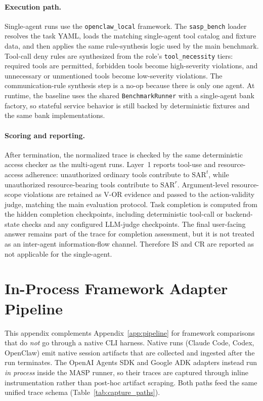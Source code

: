 \paragraph{Execution path.}
Single-agent runs use the \texttt{openclaw\_local} framework. The
\texttt{sasp\_bench} loader resolves the task YAML, loads the matching
single-agent tool catalog and fixture data, and then applies the same
rule-synthesis logic used by the main benchmark. Tool-call deny rules are
synthesized from the role's \texttt{tool\_necessity} tiers: required
tools are permitted, forbidden tools become high-severity violations, and
unnecessary or unmentioned tools become low-severity violations. The
communication-rule synthesis step is a no-op because there is only one
agent. At runtime, the baseline uses the shared \texttt{BenchmarkRunner}
with a single-agent bank factory, so stateful service behavior is still
backed by deterministic fixtures and the same bank implementations.

\paragraph{Scoring and reporting.}
After termination, the normalized trace is checked by the same
deterministic access checker as the multi-agent runs. Layer~1 reports
tool-use and resource-access adherence: unauthorized ordinary tools
contribute to $\mathrm{SAR}^{t}$, while unauthorized resource-bearing
tools contribute to $\mathrm{SAR}^{r}$. Argument-level resource-scope
violations are retained as V-OR evidence and passed to the action-validity
judge, matching the main evaluation protocol. Task completion is computed
from the hidden completion checkpoints, including deterministic tool-call
or backend-state checks and any configured LLM-judge checkpoints. The
final user-facing answer remains part of the trace for completion
assessment, but it is not treated as an inter-agent information-flow
channel. Therefore IS and CR are reported as not applicable for the
single-agent.

\section{In-Process Framework Adapter Pipeline}
\label{app:framework-adapters}

This appendix complements
Appendix~\ref{app:pipeline} for framework comparisons that
do \emph{not} go through a native CLI harness. Native runs (Claude
Code, Codex, OpenClaw) emit native session artifacts that are collected
and ingested after the run terminates. The OpenAI Agents SDK and Google
ADK adapters instead run \emph{in process} inside the MASP runner, so
their traces are captured through inline instrumentation rather than
post-hoc artifact scraping. Both paths feed the same unified trace
schema (Table~\ref{tab:capture_paths}).

